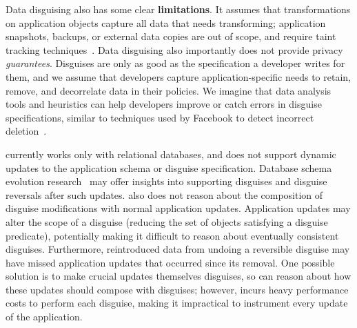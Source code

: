 Data disguising also has some clear \textbf{limitations}.
It assumes that transformations on application objects capture all data that needs transforming;
application snapshots, backups, or external data copies are out of scope, and require
\eg taint tracking techniques~\cite{schengendb}.
Data disguising also importantly does not provide privacy \emph{guarantees}.
%
Disguises are only as good as the specification a developer writes for them, and we assume
that developers capture application-specific needs to retain, remove, and decorrelate data in
their policies.
We imagine that data analysis tools and heuristics can help developers improve or catch
errors in disguise specifications, similar to techniques used by Facebook to detect incorrect
deletion~\cite{delf}.
%
%

\sys currently works only with relational databases, and does not support dynamic
updates to the application schema or disguise specification.
%
Database schema evolution research~\cite{schema:evo} may offer insights
into supporting disguises and disguise reversals after such updates.
%
\sys also does not reason about the composition of disguise modifications with normal application
updates.  Application updates may alter the scope of a disguise (\ie reducing the set of objects
satisfying a disguise predicate), potentially making it difficult to reason about eventually
consistent disguises. Furthermore, reintroduced data from undoing a reversible disguise may have
missed application updates that occurred since its removal. One possible solution is to make crucial
updates themselves disguises, so \sys can reason about how these updates should compose with
disguises; however, \sys incurs heavy performance costs to perform each disguise, making it
impractical to instrument every update of the application.


